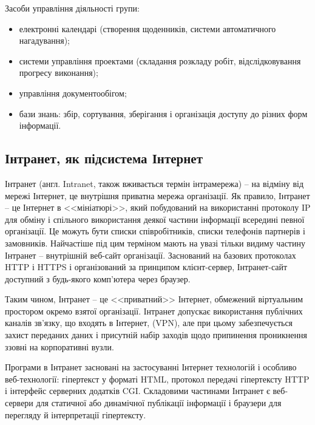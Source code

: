 Засоби управління діяльності групи:
\begin{itemize}
\item електронні календарі (створення щоденників, системи автоматичного нагадування);
\item системи управління проектами (складання розкладу робіт, відслідковування прогресу виконання);
\item управління документообігом;
\item бази знань: збір, сортування, зберігання і організація доступу до різних форм інформації.
\end{itemize}





\subsection{Інтранет, як підсистема Інтернет}
Інтранет (англ. Intranet, також вживається термін інтрамережа) -- на відміну від мережі Інтернет, це внутрішня приватна мережа організації. 
Як правило, Інтранет -- це Інтернет в <<мініатюрі>>, який побудований на використанні протоколу IP для обміну і спільного використання деякої частини інформації всередині певної організації. 
Це можуть бути списки співробітників, списки телефонів партнерів і замовників. 
Найчастіше під цим терміном мають на увазі тільки видиму частину Інтранет -- внутрішній веб-сайт організації. 
Заснований на базових протоколах HTTP і HTTPS і організований за принципом клієнт-сервер, Інтранет-сайт доступний з будь-якого комп'ютера через браузер. 
\par Таким чином, Інтранет -- це <<приватний>> Інтернет, обмежений віртуальним простором окремо взятої організації. 
Інтранет допускає використання публічних каналів зв'язку, що входять в Інтернет, (VPN), але при цьому забезпечується захист переданих даних і присутній набір заходів щодо припинення проникнення ззовні на корпоративні вузли.
\par Програми в Інтранет засновані на застосуванні Інтернет технологій і особливо веб-технології: гіпертекст у форматі HTML, протокол передачі гіпертексту HTTP і інтерфейс серверних додатків CGI. 
Складовими частинами Інтранет є веб-сервери для статичної або динамічної публікації інформації і браузери для перегляду й інтерпретації гіпертексту.

